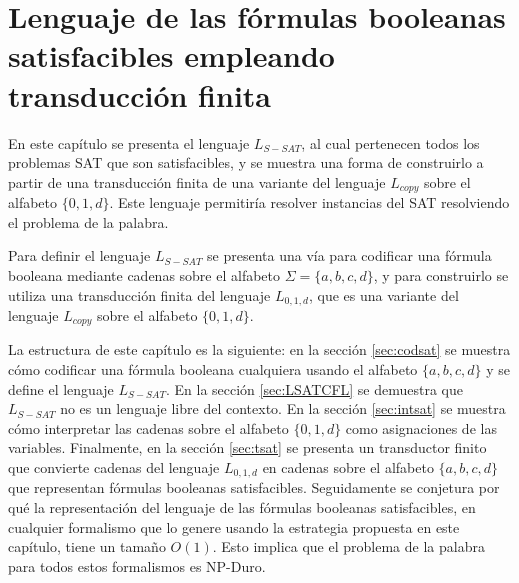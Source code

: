 


\chapter{Lenguaje de las fórmulas booleanas satisfacibles empleando transducción finita}
\label{chap:LSATFT}


En este capítulo se presenta el lenguaje $L_{S-SAT}$, al cual pertenecen todos los problemas SAT que son 
satisfacibles, y se muestra una forma de construirlo a partir de una transducción finita de una variante 
del lenguaje $L_{copy}$ sobre el alfabeto $\{0,1,d\}$. Este lenguaje permitiría resolver instancias del SAT resolviendo el problema de la palabra.  

Para definir el lenguaje $L_{S-SAT}$ se presenta una vía para codificar una fórmula booleana mediante cadenas sobre el alfabeto $\Sigma=\{a, b,c,d\}$, y para construirlo se utiliza una transducción finita del lenguaje $L_{0,1,d}$, que es una variante del lenguaje $L_{copy}$ sobre el alfabeto $\{0,1,d\}$.

La estructura de este capítulo es la siguiente: en la sección \ref{sec:codsat} se muestra cómo codificar una fórmula booleana cualquiera usando el alfabeto $\{a,b,c,d\}$ y se define el lenguaje $L_{S-SAT}$.  En la sección \ref{sec:LSATCFL} se demuestra que $L_{S-SAT}$ no es un lenguaje libre del contexto.  En la sección \ref{sec:intsat} se muestra cómo interpretar las cadenas sobre el alfabeto $\{0,1,d\}$ como asignaciones de las variables. Finalmente, en la sección \ref{sec:tsat} se presenta un transductor finito que convierte cadenas del lenguaje $L_{0,1,d}$ en cadenas sobre el alfabeto $\{a,b,c,d\}$ que representan fórmulas booleanas satisfacibles. Seguidamente se conjetura por qué la representación del lenguaje de las fórmulas booleanas satisfacibles, en cualquier formalismo que lo genere usando la estrategia propuesta en este capítulo, tiene un tamaño $O(1)$. Esto implica que el problema de la palabra para todos estos formalismos es NP-Duro.



